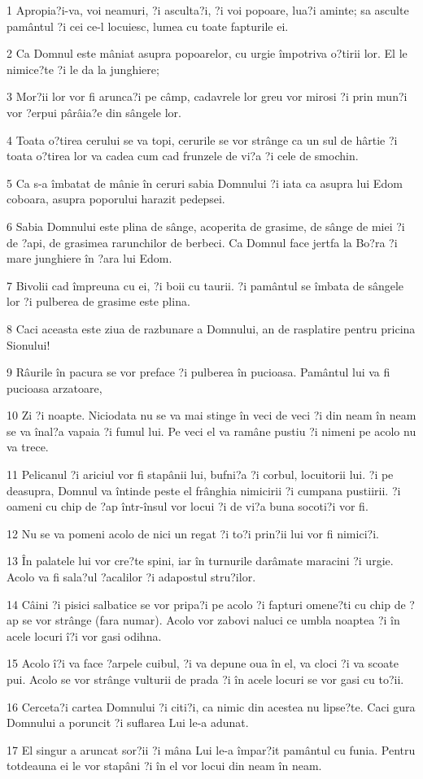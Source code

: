\par 1 Apropia?i-va, voi neamuri, ?i asculta?i, ?i voi popoare, lua?i aminte; sa asculte pamântul ?i cei ce-l locuiesc, lumea cu toate fapturile ei.
\par 2 Ca Domnul este mâniat asupra popoarelor, cu urgie împotriva o?tirii lor. El le nimice?te ?i le da la junghiere;
\par 3 Mor?ii lor vor fi arunca?i pe câmp, cadavrele lor greu vor mirosi ?i prin mun?i vor ?erpui pârâia?e din sângele lor.
\par 4 Toata o?tirea cerului se va topi, cerurile se vor strânge ca un sul de hârtie ?i toata o?tirea lor va cadea cum cad frunzele de vi?a ?i cele de smochin.
\par 5 Ca s-a îmbatat de mânie în ceruri sabia Domnului ?i iata ca asupra lui Edom coboara, asupra poporului harazit pedepsei.
\par 6 Sabia Domnului este plina de sânge, acoperita de grasime, de sânge de miei ?i de ?api, de grasimea rarunchilor de berbeci. Ca Domnul face jertfa la Bo?ra ?i mare junghiere în ?ara lui Edom.
\par 7 Bivolii cad împreuna cu ei, ?i boii cu taurii. ?i pamântul se îmbata de sângele lor ?i pulberea de grasime este plina.
\par 8 Caci aceasta este ziua de razbunare a Domnului, an de rasplatire pentru pricina Sionului!
\par 9 Râurile în pacura se vor preface ?i pulberea în pucioasa. Pamântul lui va fi pucioasa arzatoare,
\par 10 Zi ?i noapte. Niciodata nu se va mai stinge în veci de veci ?i din neam în neam se va înal?a vapaia ?i fumul lui. Pe veci el va ramâne pustiu ?i nimeni pe acolo nu va trece.
\par 11 Pelicanul ?i ariciul vor fi stapânii lui, bufni?a ?i corbul, locuitorii lui. ?i pe deasupra, Domnul va întinde peste el frânghia nimicirii ?i cumpana pustiirii. ?i oameni cu chip de ?ap într-însul vor locui ?i de vi?a buna socoti?i vor fi.
\par 12 Nu se va pomeni acolo de nici un regat ?i to?i prin?ii lui vor fi nimici?i.
\par 13 În palatele lui vor cre?te spini, iar în turnurile darâmate maracini ?i urgie. Acolo va fi sala?ul ?acalilor ?i adapostul stru?ilor.
\par 14 Câini ?i pisici salbatice se vor pripa?i pe acolo ?i fapturi omene?ti cu chip de ?ap se vor strânge (fara numar). Acolo vor zabovi naluci ce umbla noaptea ?i în acele locuri î?i vor gasi odihna.
\par 15 Acolo î?i va face ?arpele cuibul, ?i va depune oua în el, va cloci ?i va scoate pui. Acolo se vor strânge vulturii de prada ?i în acele locuri se vor gasi cu to?ii.
\par 16 Cerceta?i cartea Domnului ?i citi?i, ca nimic din acestea nu lipse?te. Caci gura Domnului a poruncit ?i suflarea Lui le-a adunat.
\par 17 El singur a aruncat sor?ii ?i mâna Lui le-a împar?it pamântul cu funia. Pentru totdeauna ei le vor stapâni ?i în el vor locui din neam în neam.

